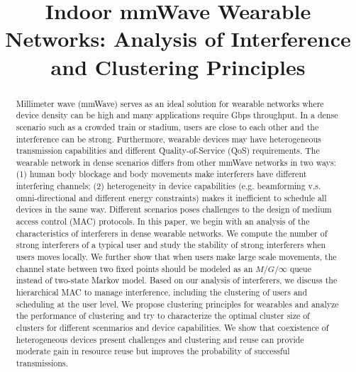 \documentclass[10pt, conference, letterpaper]{IEEEtran}
\begin{document}
\title{Indoor mmWave Wearable Networks: Analysis of Interference and Clustering Principles}

\author{
}

\maketitle

\begin{abstract}
Millimeter wave (mmWave) serves as an ideal solution for wearable networks where device density can be high and many applications require Gbps throughput. In a dense scenario such as a crowded train or stadium, users are close to each other and the interference can be strong. Furthermore, wearable devices may have heterogeneous transmission capabilities and different Quality-of-Service (QoS) requirements. The wearable network in dense scenarios differs from other mmWave networks in two ways: (1) human body blockage and body movements make interferers have different interfering channels; (2) heterogeneity in device capabilities (e.g. beamforming v.s. omni-directional and different energy constraints) makes it inefficient to schedule all devices in the same way. Different scenarios poses challenges to the design of medium access control (MAC) protocols. In this paper, we begin with an analysis of the characteristics of interferers in dense wearable networks. We compute the number of strong interferers of a typical user and study the stability of strong interferers when users moves locally. We further show that when users make large scale movements, the channel state between two fixed points should be modeled as an $M/G/\infty$ queue instead of two-state Markov model. Based on our analysis of interferers, we discuss the hierarchical MAC to manage interference, including the clustering of users and scheduling at the user level. We propose clustering principles for wearables and analyze the performance of clustering and try to characterize the optimal cluster size of clusters for different scenmarios and device capabilities. We show that coexistence of heterogeneous devices present challenges and clustering and reuse can provide moderate gain in resource reuse but improves the probability of successful transmissions. 


\end{abstract}
\IEEEpeerreviewmaketitle
\end{document}
